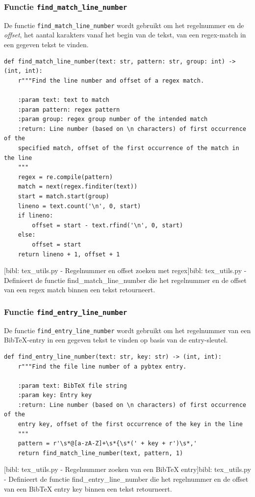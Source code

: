 \subsubsection{Functie \texttt{find\_match\_line\_number}}

De functie \texttt{find\_match\_line\_number} wordt gebruikt om het regelnummer en de \emph{offset}, het aantal karakters vanaf het begin van de tekst, van een regex-match in een gegeven tekst te vinden.

\begin{verbatim}
def find_match_line_number(text: str, pattern: str, group: int) -> (int, int):
    r"""Find the line number and offset of a regex match.

    :param text: text to match
    :param pattern: regex pattern
    :param group: regex group number of the intended match
    :return: Line number (based on \n characters) of first occurrence of the
    specified match, offset of the first occurrence of the match in the line
    """
    regex = re.compile(pattern)
    match = next(regex.finditer(text))
    start = match.start(group)
    lineno = text.count('\n', 0, start)
    if lineno:
        offset = start - text.rfind('\n', 0, start)
    else:
        offset = start
    return lineno + 1, offset + 1
\end{verbatim}
[bibl: tex\_utils.py - Regelnummer en offset zoeken met regex]{bibl: tex\_utils.py - Definieert de functie find\_match\_line\_number die het regelnummer en de offset van een regex match binnen een tekst retourneert. \label{lst:bibl_tex_utils_find_match}}

\subsubsection{Functie \texttt{find\_entry\_line\_number}}

De functie \texttt{find\_entry\_line\_number} wordt gebruikt om het regelnummer van een BibTeX-entry in een gegeven tekst te vinden op basis van de entry-sleutel.

\begin{verbatim}
def find_entry_line_number(text: str, key: str) -> (int, int):
    r"""Find the file line number of a pybtex entry.

    :param text: BibTeX file string
    :param key: Entry key
    :return: Line number (based on \n characters) of first occurrence of the
    entry key, offset of the first occurrence of the key in the line
    """
    pattern = r'\s*@[a-zA-Z]+\s*{\s*(' + key + r')\s*,'
    return find_match_line_number(text, pattern, 1)
\end{verbatim}
[bibl: tex\_utils.py - Regelnummer zoeken van een BibTeX entry]{bibl: tex\_utils.py - Definieert de functie find\_entry\_line\_number die het regelnummer en de offset van een BibTeX entry key binnen een tekst retourneert. \label{lst:bibl_tex_utils_find_entry}}


